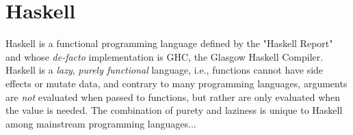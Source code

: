 \documentclass[]{lwnovathesis}
\newcommand{\mypara}[1]{\paragraph{\textbf{#1}.}}
\newcommand{\lolli}{\multimap}
\newcommand{\bang}{{!}}
\newcommand{\llet}[2]{\mathsf{let}~#1~\mathsf{in}~#2}
\begin{document}










\section{Haskell}

Haskell is a functional programming language defined by the "Haskell
Report"\cite{jones1999haskell,marlow2010haskell} and whose \emph{de-facto}
implementation is GHC, the Glasgow Haskell Compiler\cite{GHC}. Haskell is a
\emph{lazy}, \emph{purely functional} language, i.e., functions cannot
have side effects or mutate data, and contrary to many programming languages,
arguments are \emph{not} evaluated when passed to functions, but rather are only
evaluated when the value is needed. The combination of purety and laziness is
unique to Haskell among mainstream programming languages...
\end{document}
